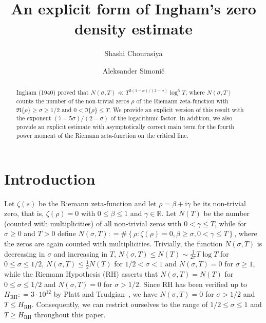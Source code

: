 \documentclass[a4paper,reqno]{amsart}
\theoremstyle{definition}
\newcommand{\R}{\mathbb{R}}
\newcommand{\de}[0]{\mathrel{\mathop:}=}
\newcommand{\ie}[0]{\mathrm{i}}
\begin{document}
\title{An explicit form of Ingham's zero density estimate}
\author[Shashi Chourasiya]{Shashi Chourasiya}
\address{
    SC: School of Science, University of New South Wales (Canberra), Northcott Drive, Campbell, ACT 2600, Australia
}
\author[Aleksander Simoni\v{c} ]{Aleksander Simoni\v{c} }
\address{
    AS: Faculty of Mathematics, Natural Sciences and Information Technologies, University of Primorska, Glagolja\v{s}ka 8, 6000 Koper, Slovenia
}

\begin{abstract}
Ingham (1940) proved that $N(\sigma,T)\ll T^{3(1-\sigma)/(2-\sigma)}\log^{5}{T}$, where $N(\sigma,T)$ counts the number of the non-trivial zeros $\rho$ of the Riemann zeta-function with $\Re\{\rho\}\geq\sigma\geq 1/2$ and $0<\Im\{\rho\}\leq T$. We provide an explicit version of this result with the exponent $(7-5\sigma)/(2-\sigma)$ of the logarithmic factor. In addition, we also provide an explicit estimate with asymptotically correct main term for the fourth power moment of the Riemann zeta-function on the critical line.
\end{abstract}

\maketitle
\thispagestyle{empty}

\section{Introduction}
Let $\zeta(s)$ be the Riemann zeta-function and let $\rho=\beta+\ie\gamma$ be its non-trivial zero, that is, $\zeta(\rho)=0$ with $0\leq\beta\leq 1$ and $\gamma\in\R$.  Let $N(T)$ be the number (counted with multiplicities) of all non-trivial zeros with $0<\gamma\leq T$, while for $\sigma\geq 0$ and $T>0$ define 
$N(\sigma,T)\de \# \left\{ \rho \colon \zeta(\rho)=0, \beta\geq\sigma, 0<\gamma\leq T\right\}$, where the zeros are again counted with multiplicities. Trivially, the function $N(\sigma,T)$ is decreasing in $\sigma$ and increasing in $T$, $N(\sigma,T)\leq N(T)\sim\frac{1}{2\pi}T\log{T}$ for $0\leq\sigma\leq 1/2$, $N(\sigma,T)\leq \frac{1}{2}N(T)$ for $1/2<\sigma<1$ and $N(\sigma,T)=0$ for $\sigma\geq 1$, while the Riemann Hypothesis (RH) asserts that $N(\sigma,T)=N(T)$ for $0\leq\sigma\leq1/2$ and $N(\sigma,T)=0$ for $\sigma>1/2$. Since RH has been verified up to $H_{\mathrm{RH}}\de 3\cdot 10^{12}$ by Platt and Trudgian~\cite{PT21}, we have $N(\sigma,T)=0$ for $\sigma>1/2$ and $T \leq H_{\mathrm{RH}}$. Consequently, we can restrict ourselves to the range of $1/2\leq\sigma\leq1$ and $T\geq H_{\mathrm{RH}}$ throughout this paper.
\end{document}
